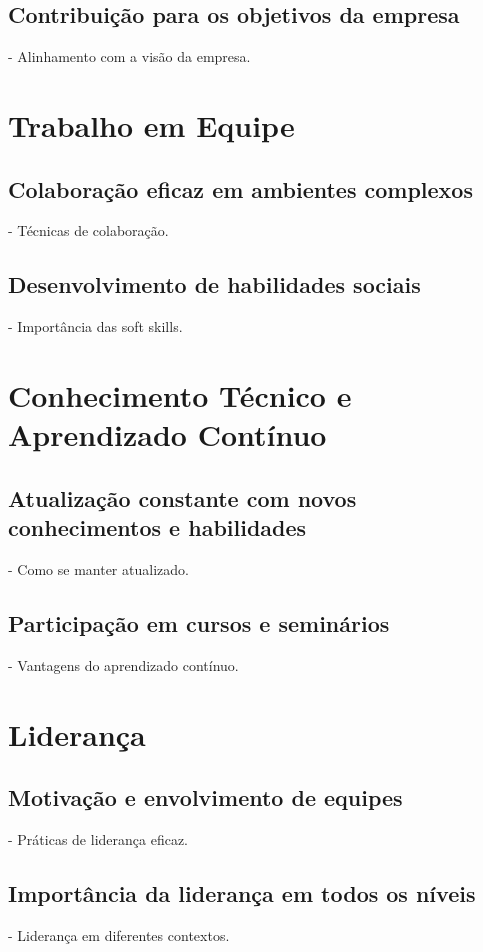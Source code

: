 \documentclass{ufersa}
\begin{document}
\subsection{Contribuição para os objetivos da empresa}
- Alinhamento com a visão da empresa.

\section{Trabalho em Equipe}
\subsection{Colaboração eficaz em ambientes complexos}
- Técnicas de colaboração.

\subsection{Desenvolvimento de habilidades sociais}
- Importância das soft skills.

\section{Conhecimento Técnico e Aprendizado Contínuo}
\subsection{Atualização constante com novos conhecimentos e habilidades}
- Como se manter atualizado.

\subsection{Participação em cursos e seminários}
- Vantagens do aprendizado contínuo.

\section{Liderança}
\subsection{Motivação e envolvimento de equipes}
- Práticas de liderança eficaz.

\subsection{Importância da liderança em todos os níveis}
- Liderança em diferentes contextos.
\end{document}
